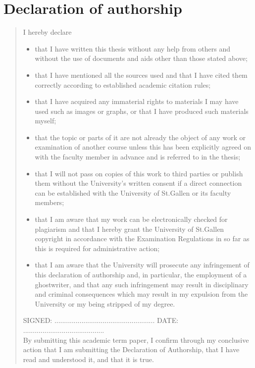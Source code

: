 %
%
%
%
\chapter*{Declaration of authorship}
\begin{SingleSpace}
\begin{quote}
I hereby declare

\begin{itemize}
    \item that I have written this thesis without any help from others and without the use of documents and aids other than those stated above;
    \item that I have mentioned all the sources used and that I have cited them correctly according to established academic citation rules;
    \item that I have acquired any immaterial rights to materials I may have used such as images or graphs, or that I have produced such materials myself;
    \item that the topic or parts of it are not already the object of any work or examination of another course unless this has been explicitly agreed on with the faculty member in advance and is referred to in the thesis;
    \item that I will not pass on copies of this work to third parties or publish them without the University's written consent if a direct connection can be established with the University of St.Gallen or its faculty members;
    \item that I am aware that my work can be electronically checked for plagiarism and that I hereby grant the University of St.Gallen copyright in accordance with the Examination Regulations in so far as this is required for administrative action;
    \item that I am aware that the University will prosecute any infringement of this declaration of authorship and, in particular, the employment of a ghostwriter, and that any such infringement may result in disciplinary and criminal consequences which may result in my expulsion from the University or my being stripped of my degree.
\end{itemize}


\vspace{1.5cm}
\noindent
\hspace{-0.75cm}\textsc{SIGNED: .................................................... DATE: ..........................................}\\

By submitting this academic term paper, I confirm through my conclusive action that I am
submitting the Declaration of Authorship, that I have read and understood it, and that it is
true.
\end{quote}
\end{SingleSpace}
\clearpage